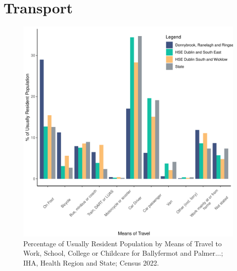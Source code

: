 \documentclass{article}
\begin{document}
\section{Transport}\label{sect:Trans}
\begin{figure}[H]
	\centering
	\includegraphics[width = 120mm]{../figures/TravelED.pdf}
	\caption{Percentage of Usually Resident Population by Means of Travel to Work, School, College or Childcare for Ballyfermot and Palmer...; IHA, Health Region and State; Census 2022.}
	\label{fig:vbnv}
	\end{figure}
\end{document}
